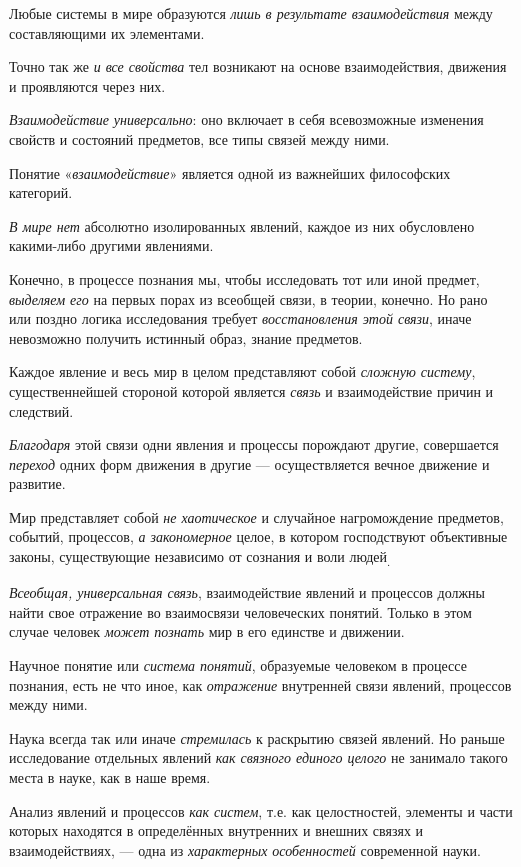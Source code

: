 \documentclass[a4paper,14pt,russian]{extreport}
\begin{document}
Любые системы в мире образуются \emph{лишь в результате взаимодействия} между составляющими их элементами.

Точно так же \emph{и все свойства} тел возникают на основе взаимодействия, движения и проявляются через них.

\emph{Взаимодействие универсально}: оно включает в себя всевозможные изменения свойств и состояний предметов, все типы связей между ними.

Понятие «\emph{взаимодействие}» является одной из важнейших философских категорий.

\emph{В мире нет} абсолютно изолированных явлений, каждое из них обусловлено какими-либо другими явлениями.

Конечно, в процессе познания мы, чтобы исследовать тот или иной предмет, \emph{выделяем его} на первых порах из всеобщей связи, в теории, конечно. Но рано или поздно логика исследования требует \emph{восстановления этой связи}, иначе невозможно получить истинный образ, знание предметов.

Каждое явление и весь мир в целом представляют собой \emph{сложную систему}, существеннейшей стороной которой является \emph{связь} и взаимодействие причин и следствий.

\emph{Благодаря} этой связи одни явления и процессы порождают другие, совершается \emph{переход} одних форм движения в другие --- осуществляется вечное движение и развитие.

Мир представляет собой \emph{не хаотическое} и случайное нагромождение предметов, событий, процессов, \emph{а закономерное} целое, в котором господствуют объективные законы, существующие независимо от сознания и воли людей\textsubscript{.}

\emph{Всеобщая, универсальная связь}, взаимодействие явлений и процессов должны найти свое отражение во взаимосвязи человеческих понятий. Только в этом случае человек \emph{может познать} мир в его единстве и движении.

Научное понятие или \emph{система понятий}, образуемые человеком в процессе познания, есть не что иное, как \emph{отражение} внутренней связи явлений, процессов между ними.

Наука всегда так или иначе \emph{стремилась} к раскрытию связей явлений. Но раньше исследование отдельных явлений \emph{как связного единого целого} не занимало такого места в науке, как в наше время.

Анализ явлений и процессов \emph{как систем}, т.е. как целостностей, элементы и части которых находятся в определённых внутренних и внешних связях и взаимодействиях, --- одна из \emph{характерных особенностей} современной науки.
\end{document}

